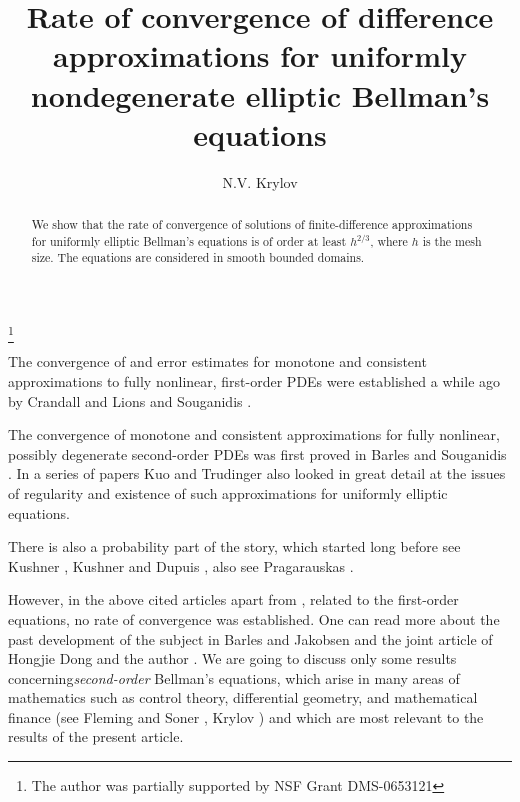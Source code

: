 \documentclass[11pt, reqno]{amsart}
\theoremstyle{definition}
\theoremstyle{remark}
\begin{document}
\title[Rate of convergence]
{Rate of convergence
 of difference approximations 
for uniformly nondegenerate   elliptic Bellman's
equations}

 
\author{N.V. Krylov}
\thanks{The  author was partially supported by
NSF Grant DMS-0653121}
\address{127 Vincent Hall, University of Minnesota,
 Minneapolis, MN, 55455}

 



\begin{abstract}
We show that the rate of convergence of 
solutions of 
finite-difference
  approximations for uniformly elliptic Bellman's
equations is of order at least $h^{2/3}$, where $h$ is the mesh size.
The equations are considered in smooth bounded domains.
\end{abstract}

\maketitle

The convergence of and error estimates for monotone and consistent
 approximations to
fully nonlinear, first-order PDEs were established a while ago by
 Crandall and Lions
\cite{CL} and Souganidis \cite{So}. 

The convergence 
of monotone and consistent
approximations for fully nonlinear, possibly degenerate 
second-order 
PDEs was first
proved in Barles and Souganidis \cite{BS}.  In a series 
of papers Kuo and 
Trudinger \cite{KT90,KT92,KT96}
  also looked in great detail at the issues of regularity and 
existence of such
approximations for uniformly elliptic equations.

There is also a probability part of the story, which
 started long before see Kushner \cite{Ku},
Kushner and Dupuis \cite{KD}, also see Pragarauskas \cite{Pr}.

However, in the above cited articles
apart from \cite{CL,So}, related to the first-order equations,
 no rate of convergence
was established. One can read more about the past development
of the subject in Barles and Jakobsen \cite{BJ07} and  the joint article
of Hongjie Dong and the author \cite{DK07}. We are going to discuss
only some results concerning{\em second-order\/} Bellman's equations,
which arise in many areas of mathematics such as  control
theory, differential geometry, and mathematical finance
(see Fleming and Soner \cite{FS06}, Krylov \cite{Kr77}) and which are most relevant
to the results of the present article.  
\end{document}
